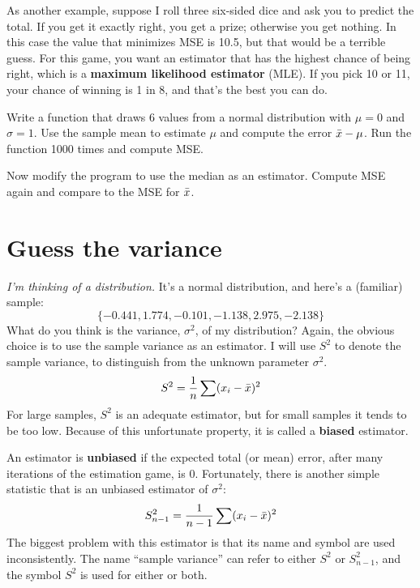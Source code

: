 \documentclass[12pt]{book}
\begin{document}
As another example, suppose I roll three six-sided dice and ask you
to predict the total.  If you get it exactly right, you get a prize;
otherwise you get nothing.  In this case the value that minimizes MSE
is 10.5, but that would be a terrible guess.  For this game, you
want an estimator that has the highest chance of being right, which is
a {\bf maximum likelihood estimator} (MLE).  If you pick 10 or 11, your
chance of winning is 1 in 8, and that's the best you can do.

\begin{ex}


Write a function that draws 6 values from a normal distribution with
$\mu=0$ and $\sigma=1$.  Use the sample mean to estimate $\mu$ and
compute the error $\bar{x} - \mu$.  Run the function 1000 times and
compute MSE.

Now modify the program to use the median as an
estimator.  Compute MSE again and compare to the MSE for $\bar{x}$.

\end{ex}


\section{Guess the variance}


{\em I'm thinking of a distribution.}  It's a normal distribution, and 
here's a (familiar) sample:
%
\[ \{ -0.441, 1.774, -0.101, -1.138, 2.975, -2.138 \} \]
%
What do you think is the variance, $\sigma^2$, of my distribution?
Again, the obvious choice is to use the sample variance as an estimator.
I will use $S^2$ to denote the sample variance, to distinguish from the
unknown parameter $\sigma^2$.
%
\[ S^2 = \frac{1}{n} \sum (x_i - \bar{x})^2 \] 
%
For large samples, $S^2$ is an adequate estimator, but for small
samples it tends to be too low.  Because of this unfortunate
property, it is called a {\bf biased} estimator.

An estimator is {\bf unbiased} if the expected total (or mean) error,
after many iterations of the estimation game, is 0.
Fortunately, there is another simple statistic that is an unbiased
estimator of $\sigma^2$:
%
\[ S_{n-1}^2 = \frac{1}{n-1} \sum (x_i - \bar{x})^2 \] 
%
The biggest problem with this estimator is that its name and symbol
are used inconsistently.  The name ``sample variance'' can refer to
either $S^2$ or $S_{n-1}^2$, and the symbol $S^2$ is used
for either or both.
\end{document}
